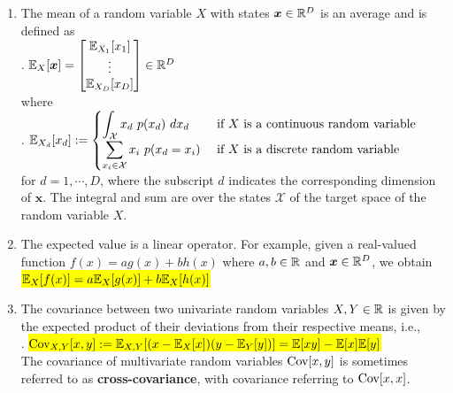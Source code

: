 \begin{enumerate}[series=calcrulesrv]
    \item The mean of a random variable $X$ with states $\bm{x} \in \mathbb{R}^D$ is an average and is defined as
    \hfill \cite{mfml/book/mml/Deisenroth-Faisal-Ong}
    \\[0.2cm]
    .\hfill
    $
        \mathbb{E}_X [\bm{x}] =
        \begin{bmatrix}
            \mathbb{E}_{X_1} [x_1] \\
            \vdots \\
            \mathbb{E}_{X_D} [x_D ]
        \end{bmatrix}
        \in \mathbb{R}^D 
    $
    \hfill \cite{mfml/book/mml/Deisenroth-Faisal-Ong}
    \\[0.2cm]
    where
    \hfill \cite{mfml/book/mml/Deisenroth-Faisal-Ong}
    \\[0.2cm]
    .\hfill
    $
        \mathbb{E}_{X_d} [x_d] :=
        \begin{cases}
            \displaystyle\int_{\mathcal{X}} x_d\ p(x_d)\ dx_d & \text{ if $X$ is a continuous random variable} \\[0.2cm]
            \displaystyle\sum_{x_i \in \mathcal{X}} x_i\ p(x_d = x_i) & \text{ if $X$ is a discrete random variable}
        \end{cases}
    $
    \hfill \cite{mfml/book/mml/Deisenroth-Faisal-Ong}
    \\[0.2cm]
    for $d = 1, \cdots , D$, where the subscript $d$ indicates the corresponding dimension of $\bm{x}$. 
    The integral and sum are over the states $\mathcal{X}$ of the target space of the random variable $X$.
    \hfill \cite{mfml/book/mml/Deisenroth-Faisal-Ong}

    \item The expected value is a linear operator. 
    For example, given a real-valued function $f (x) = ag(x) + bh(x)$ where $a, b \in \mathbb{R}$ and $\bm{x} \in \mathbb{R}^D $, we obtain 
    \colorbox{yellow}{$ \mathbb{E}_X [f (x)] = a\mathbb{E}_X [g(x)] + b\mathbb{E}_X [h(x)] $}
    \hfill \cite{mfml/book/mml/Deisenroth-Faisal-Ong}

    \item The covariance between two univariate random variables $X, Y \in \mathbb{R}$ is given by the expected product of their deviations from their respective means, i.e.,
    \hfill \cite{mfml/book/mml/Deisenroth-Faisal-Ong}
    \\[0.2cm]
    .\hfill
    \colorbox{yellow}{$
        \text{Cov}_{X,Y} [x, y] 
        := \mathbb{E}_{X,Y} [(x - \mathbb{E}_X [x])(y - \mathbb{E}_Y [y])]
        = \mathbb{E}[xy] - \mathbb{E}[x]\mathbb{E}[y]
    $}
    \hfill \cite{mfml/book/mml/Deisenroth-Faisal-Ong}
    \\[0.2cm]
    The covariance of multivariate random variables $\text{Cov}[x, y]$ is sometimes referred to as \textbf{cross-covariance}, with covariance referring to $\text{Cov}[x, x]$.
    \hfill \cite{mfml/book/mml/Deisenroth-Faisal-Ong}


\end{enumerate}
